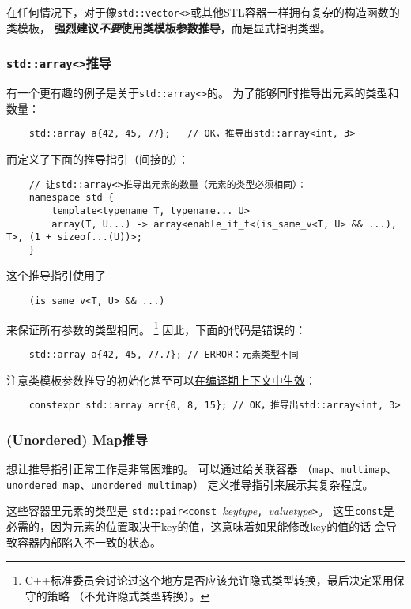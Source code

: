 在任何情况下，对于像\texttt{std::vector<>}或其他STL容器一样拥有复杂的构造函数的类模板，
\textbf{强烈建议\emph{不要}使用类模板参数推导}，而是显式指明类型。

\subsubsection{\texttt{std::array<>}推导}\label{ch9.2.6.3}
有一个更有趣的例子是关于\texttt{std::array<>}的。
为了能够同时推导出元素的类型和数量：
\begin{lstlisting}
    std::array a{42, 45, 77};   // OK，推导出std::array<int, 3>
\end{lstlisting}
而定义了下面的推导指引（间接的）：
\begin{lstlisting}
    // 让std::array<>推导出元素的数量（元素的类型必须相同）：
    namespace std {
        template<typename T, typename... U>
        array(T, U...) -> array<enable_if_t<(is_same_v<T, U> && ...), T>, (1 + sizeof...(U))>;
    }
\end{lstlisting}
这个推导指引使用了
\begin{lstlisting}
    (is_same_v<T, U> && ...)
\end{lstlisting}
来保证所有参数的类型相同。
\footnote{C++标准委员会讨论过这个地方是否应该允许隐式类型转换，最后决定采用保守的策略
（不允许隐式类型转换）。}
因此，下面的代码是错误的：
\begin{lstlisting}
    std::array a{42, 45, 77.7}; // ERROR：元素类型不同
\end{lstlisting}
注意类模板参数推导的初始化甚至可以\hyperref[ch28.5]{在编译期上下文中生效}：
\begin{lstlisting}
    constexpr std::array arr{0, 8, 15}; // OK，推导出std::array<int, 3>
\end{lstlisting}

\subsubsection{(Unordered) Map推导}
想让推导指引正常工作是非常困难的。
可以通过给关联容器
（\texttt{map}、\texttt{multimap}、\texttt{unordered\_map}、\texttt{unordered\_multimap}）
定义推导指引来展示其复杂程度。

这些容器里元素的类型是
\texttt{std::pair<const }\emph{keytype}\texttt{, }\emph{valuetype}\texttt{>}。
这里\texttt{const}是必需的，因为元素的位置取决于key的值，这意味着如果能修改key的值的话
会导致容器内部陷入不一致的状态。

